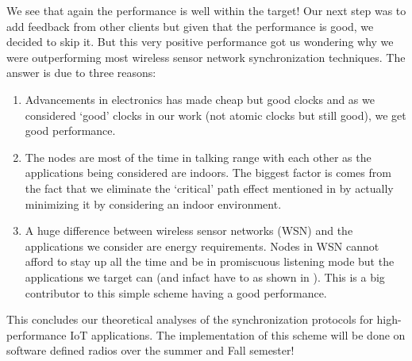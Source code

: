 \documentclass[10pt, journal, letter, onecolumn]{IEEEtran}
\begin{document}
We see that again the performance is well within the target! Our next step was to add feedback from other clients but given that the performance is good, we decided to skip it. But this very positive performance got us wondering why we were outperforming most wireless sensor network synchronization techniques. The answer is due to three reasons:
\begin{enumerate}
\item Advancements in electronics has made cheap but good clocks and as we considered `good' clocks in our work (not atomic clocks but still good), we get good performance.
\item The nodes are most of the time in talking range with each other as the applications being considered are indoors. The biggest factor is comes from the fact that we eliminate the `critical' path effect mentioned in \cite{elson2002fine} by actually minimizing it by considering an indoor environment.
\item A huge difference between wireless sensor networks (WSN) and the applications we consider are energy requirements. Nodes in WSN cannot afford to stay up all the time and be in promiscuous listening mode but the applications we target can (and infact have to as shown in \cite{swamy2015cooperative}). This is a big contributor to this simple scheme having a good performance.
\end{enumerate}

This concludes our theoretical analyses of the synchronization protocols for high-performance IoT applications. The implementation of this scheme will be done on software defined radios over the summer and Fall semester!



\end{document}
